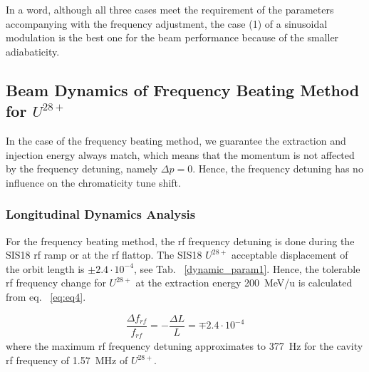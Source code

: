 In a word, although all three cases meet the requirement of the parameters accompanying with the frequency adjustment, the case (1) of a sinusoidal modulation is the best one for the beam performance because of the smaller adiabaticity.  
\subsection{Beam Dynamics of Frequency Beating Method for $U^\mathit{28+}$} 
In the case of the frequency beating method, we guarantee the extraction and injection energy always match, which means that the momentum is not affected by the frequency detuning, namely $\Delta p = 0$. Hence, the frequency detuning has no influence on the chromaticity tune shift.

\subsubsection{Longitudinal Dynamics Analysis}
 
For the frequency beating method, the rf frequency detuning is done during the SIS18 rf ramp or at the rf flattop. The SIS18 $U^\mathit{28+}$ acceptable displacement of the orbit length is $\pm2.4\cdot 10^{-4}$, see Tab. ~\ref{dynamic_param1}. Hence, the tolerable rf frequency change for $U^{28+}$ at the extraction energy \SI{200}{MeV/u} is calculated from eq. ~\ref{eq:eq4}.

\begin{equation}
\frac{\Delta{f}_\mathit{rf}}{f_\mathit{rf}} = -\frac{\Delta L}{L}= \mp 2.4 \cdot 10^{-4}
\end{equation}
where the maximum rf frequency detuning approximates to \SI{377}{Hz} for the cavity rf frequency of \SI{1.57}{MHz} of $U^{28+}$.

